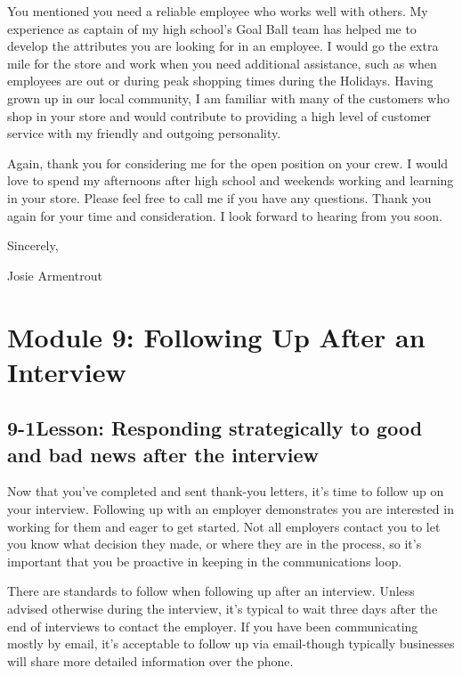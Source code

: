 You mentioned you need a reliable employee who works well with others. My experience as captain of my high school's Goal Ball team has helped me to develop the attributes you are looking for in an employee. I would go the extra mile for the store and work when you need additional assistance, such as when employees are out or during peak shopping times during the Holidays. Having grown up in our local community, I am familiar with many of the customers who shop in your store and would contribute to providing a high level of customer service with my friendly and outgoing personality.

Again, thank you for considering me for the open position on your crew. I would love to spend my afternoons after high school and weekends working and learning in your store. Please feel free to call me if you have any questions. Thank you again for your time and consideration. I look forward to hearing from you soon.

Sincerely,

Josie Armentrout
 
 
\pagebreak \section*{Module 9:	Following Up After an Interview}
\noindent\makebox[\textwidth]{\rule{\linewidth}{0.4pt}}  \localtableofcontents 
\noindent\makebox[\textwidth]{\rule{\linewidth}{0.4pt}} 


\pagebreak \subsection*{9-1\quad Lesson: Responding strategically to good and bad news after the interview}
Now that you've completed and sent thank-you letters, it's time to follow up on your interview. Following up with an employer demonstrates you are interested in working for them and eager to get started. Not all employers contact you to let you know what decision they made, or where they are in the process, so it's important that you be proactive in keeping in the communications loop.

There are standards to follow when following up after an interview. Unless advised otherwise during the interview, it's typical to wait three days after the end of interviews to contact the employer. If you have been communicating mostly by email, it's acceptable to follow up via email-though typically businesses will share more detailed information over the phone.


